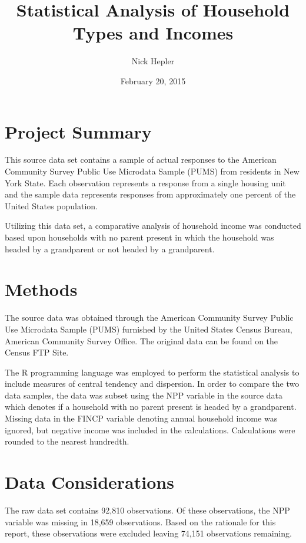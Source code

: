 \documentclass[oneside]{article}
\title{Statistical Analysis of Household Types and Incomes}
\author{Nick Hepler}
\date{February 20, 2015}
\begin{document}
\maketitle 

\section{Project Summary}

This source data set contains a sample of actual responses to the American Community Survey Public Use Microdata Sample (PUMS) from residents in New York State. Each observation represents a response from a single housing unit and the sample data represents responses from approximately one percent of the United States population.

Utilizing this data set, a comparative analysis of household income was conducted based upon households with no parent present in which the household was headed by a grandparent or not headed by a grandparent.

\section{Methods}

The source data was obtained through the American Community Survey Public Use Microdata Sample (PUMS) furnished by the United States Census Bureau, American Community Survey Office. The original data can be found on the Census FTP Site.

The R programming language was employed to perform the statistical analysis to include measures of central tendency and dispersion. In order to compare the two data samples, the data was subset using the NPP variable in the source data which denotes if a household with no parent present is headed by a grandparent. Missing data in the FINCP variable denoting annual household income was ignored, but negative income was included in the calculations. Calculations were rounded to the nearest hundredth.

\section{Data Considerations}

The raw data set contains 92,810 observations. Of these observations, the NPP variable was missing in 18,659 observations. Based on the rationale for this report, these observations were excluded leaving 74,151 observations remaining.
\end{document}
